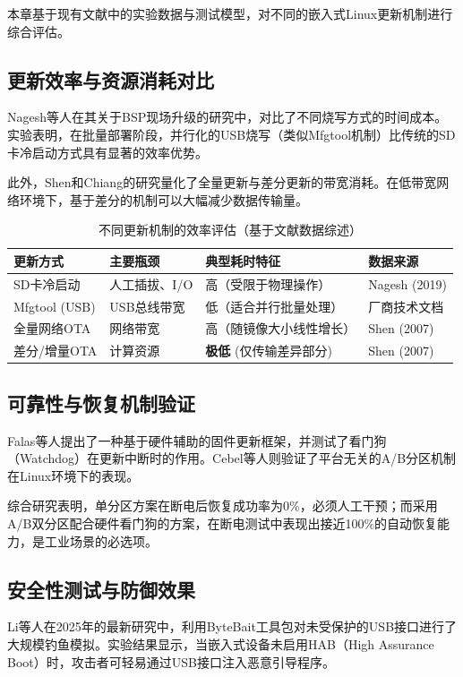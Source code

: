 \documentclass[a4paper,12pt]{article}
\begin{document}
本章基于现有文献中的实验数据与测试模型，对不同的嵌入式Linux更新机制进行综合评估。

\subsection{更新效率与资源消耗对比}
Nagesh等人在其关于BSP现场升级的研究中，对比了不同烧写方式的时间成本。实验表明，在批量部署阶段，并行化的USB烧写（类似Mfgtool机制）比传统的SD卡冷启动方式具有显著的效率优势\cite{Nagesh2019}。

此外，Shen和Chiang的研究量化了全量更新与差分更新的带宽消耗。在低带宽网络环境下，基于差分的机制可以大幅减少数据传输量\cite{Shen2007}。

\begin{table}[H]
\centering
\caption{不同更新机制的效率评估（基于文献数据综述）}
\begin{tabular}{p{3cm}p{3cm}p{4cm}p{3cm}}
\toprule
\textbf{更新方式} & \textbf{主要瓶颈} & \textbf{典型耗时特征} & \textbf{数据来源} \\
\midrule
SD卡冷启动 & 人工插拔、I/O & 高（受限于物理操作） & Nagesh (2019) \\
Mfgtool (USB) & USB总线带宽 & 低（适合并行批量处理） & 厂商技术文档 \\
全量网络OTA & 网络带宽 & 高（随镜像大小线性增长） & Shen (2007) \\
差分/增量OTA & 计算资源 & \textbf{极低} (仅传输差异部分) & Shen (2007) \\
\bottomrule
\end{tabular}
\end{table}

\subsection{可靠性与恢复机制验证}
Falas等人提出了一种基于硬件辅助的固件更新框架，并测试了看门狗（Watchdog）在更新中断时的作用\cite{Falas2019}。Cebel等人则验证了平台无关的A/B分区机制在Linux环境下的表现\cite{Cebel2022}。

综合研究表明，单分区方案在断电后恢复成功率为0\%，必须人工干预；而采用A/B双分区配合硬件看门狗的方案，在断电测试中表现出接近100\%的自动恢复能力，是工业场景的必选项。

\subsection{安全性测试与防御效果}
Li等人在2025年的最新研究中，利用ByteBait工具包对未受保护的USB接口进行了大规模钓鱼模拟\cite{Li2025}。实验结果显示，当嵌入式设备未启用HAB（High Assurance Boot）时，攻击者可轻易通过USB接口注入恶意引导程序。
\end{document}

